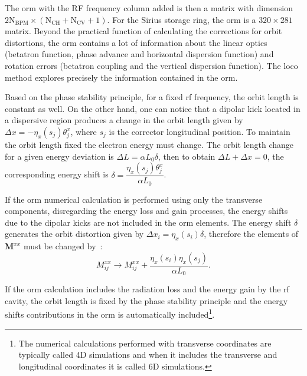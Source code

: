The \gls{orm} with the RF frequency column added is then a matrix with dimension $2 \mathrm{N}_{\mathrm{BPM}} \times \left(\mathrm{N}_{\mathrm{CH}} + \mathrm{N}_{\mathrm{CV}}+1\right)$. For the Sirius storage ring, the \gls{orm} is a $320 \times 281$ matrix. Beyond the practical function of calculating the corrections for orbit distortions, the \gls{orm} contains a lot of information about the linear optics (betatron function, phase advance and horizontal dispersion function) and rotation errors (betatron coupling and the vertical dispersion function). The \gls{loco} method explores precisely the information contained in the \gls{orm}.

Based on the phase stability principle, for a fixed \gls{rf} frequency, the orbit length is constant as well. On the other hand, one can notice that a dipolar kick located in a dispersive region produces a change in the orbit length given by $\Delta x = -\eta_x(s_j)\theta^x_j$, where $s_j$ is the corrector longitudinal position. To maintain the orbit length fixed the electron energy must change. The orbit length change for a given energy deviation is $\Delta L = \alpha L_0 \delta$, then to obtain $\Delta L + \Delta x = 0$, the corresponding energy shift is $\delta = \dfrac{\eta_x(s_j) \theta^x_j}{\alpha L_0}$. 

If the \gls{orm} numerical calculation is performed using only the transverse components, disregarding the energy loss and gain processes, the energy shifts due to the dipolar kicks are not included in the \gls{orm} elements. The energy shift $\delta$ generates the orbit distortion given by $\Delta x_i = \eta_x(s_i)\delta$, therefore the elements of $\mathbf{M}^{xx}$ must be changed by~\cite{huang2019beam}:
\begin{equation}
    M_{ij}^{xx} \rightarrow M_{ij}^{xx} + \dfrac{\eta_x(s_i)\eta_x(s_j)}{\alpha L_0}.
\end{equation}

If the \gls{orm} calculation includes the radiation loss and the energy gain by the \gls{rf} cavity, the orbit length is fixed by the phase stability principle and the energy shifts contributions in the \gls{orm} is automatically included\footnote{The numerical calculations performed with transverse coordinates are typically called 4D simulations and when it includes the transverse and longitudinal coordinates it is called 6D simulations.}.


